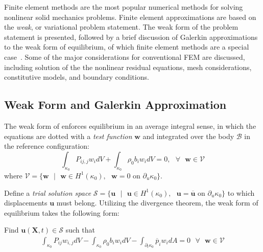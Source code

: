 Finite element methods are the most popular numerical methods for solving nonlinear solid mechanics problems. Finite element approximations are based on the \textit{weak}, or variational problem statement. The weak form of the problem statement is presented, followed by a brief discussion of Galerkin approximations to the weak form of equilibrium, of which finite element methods are a special case~\cite{rashid_2017}. Some of the major considerations for conventional FEM are discussed, including solution of the the nonlinear residual equations, mesh considerations, constitutive models, and boundary conditions.

\subsection{Weak Form and Galerkin Approximation}

The weak form of  enforces equilibrium in an average integral sense, in which the equations are dotted with a \textit{test function} $\bm{w}$ and integrated over the body $\mathcal{B}$ in the reference configuration:
\begin{equation}
\int_{\kappa_0}{P_{ij,j}}w_idV + \int_{\kappa_0}\rho_0b_iw_idV = 0, \text{\ \ } \forall \text{\ \ } \bm{w} \in \mathcal{V}
\end{equation}
where $\mathcal{V} = \lbrace\bm{w} \text{\ }|\text{\ } \bm{w} \in H^1(\kappa_0), \text{\ }\bm{w} = 0 \text{\ on\ } \partial_u\kappa_0\rbrace$.

Define a \textit{trial solution space} $\mathcal{S} = \lbrace\bm{u} \text{\ }|\text{\ } \bm{u} \in H^1(\kappa_0), \text{\ }\bm{u} = \overline{\bm{u}} \text{\ on\ } \partial_u\kappa_0\rbrace$  to which displacements $\bm{u}$ must belong. Utilizing the divergence theorem, the weak form of equilibrium takes the following form:

Find $\bm{u}(\bm{X},t) \in \mathcal{S}$ such that
\begin{gather}
\int_{\kappa_0}P_{ij}w_{i,j}dV - \int_{\kappa_0}\rho_0b_iw_idV - \int_{\partial_t\kappa_0}\overline{p}_iw_idA = 0 \text{\ \ } \forall \text{\ \ } \bm{w} \in \mathcal{V}
\end{gather}

